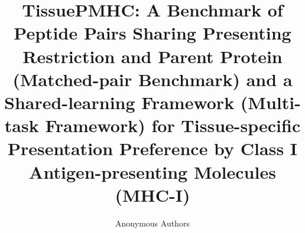 \documentclass{article}
\title{TissuePMHC: A Benchmark of Peptide Pairs Sharing Presenting Restriction and Parent Protein (Matched-pair Benchmark) and a Shared-learning Framework (Multi-task Framework) for Tissue-specific Presentation Preference by Class I Antigen-presenting Molecules (MHC-I)}
\author{Anonymous Authors}
\date{}
\begin{document}
\maketitle













\clearpage
\appendix
\renewcommand{\thefigure}{A\arabic{figure}}
\setcounter{figure}{0}
\renewcommand{\thetable}{A\arabic{table}}
\setcounter{table}{0}


\clearpage

\end{document}
